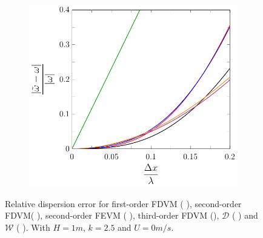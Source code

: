 \begin{figure}
\begin{subfigure}{0.5\textwidth}
	\end{subfigure}
	\par\bigskip
	\begin{subfigure}{0.5\textwidth}
		\includegraphics[width=\textwidth]{./chp4/figures/New/Dispu0Fill.pdf}
	\end{subfigure}
	\caption{Relative dispersion error for first-order FDVM ({\color{green!60!black} \solidrule}), second-order FDVM({\color{red} \solidrule}), second-order FEVM ({\color{blue} \solidrule}), third-order FDVM ({\solidrule}), $\mathcal{D}$ ({\color{violet!80!white} \solidrule}) and $\mathcal{W}$ ({\color{orange} \solidrule}). With $H = 1m$, $k = 2.5$ and $U = 0m/s$.}
	\label{fig:Dispu0Fill}
\end{figure}

